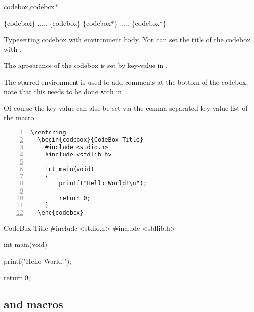 \documentclass{ctxdoc-en}
\begin{document}
\begin{function}[added=2021-12-25,updated=2021-12-25]{codebox,codebox*}
  \begin{syntax}
    \{codebox\}
    .....
    \{codebox\}
    \{codebox*\}
    .....
    \{codebox*\}
  \end{syntax}
  Typesetting codebox with environment body.
  You can set the title of the codebox with .

  The appearance of the codebox is set by key-value in .

  The starred environment  is used to add comments at the bottom of the codebox,
  note that this needs to be done with  in .

  Of course the key-value  can alse be set
  via the comma-separated key-value list of the  macro.
\end{function}

\begin{Verbatim}[frame=none,numbers=left,gobble=2]
  \centering
  \begin{codebox}{CodeBox Title}
    #include <stdio.h>
    #include <stdlib.h>

    int main(void)
    {
        printf("Hello World!\n");

        return 0;
    }
  \end{codebox}
\end{Verbatim}

\begin{center}
  \begin{minipage}{0.85\textwidth}
    \begin{codebox}{CodeBox Title}
      #include <stdio.h>
      #include <stdlib.h>

      int main(void)
      {
          printf("Hello World!\n");

          return 0;
      }
    \end{codebox}
  \end{minipage}
\end{center}

\subsection{ and  macros}
\end{document}
